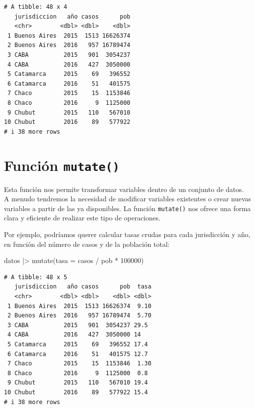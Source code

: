 \documentclass[
  spanish,
  a4paper,
]{scrbook}
\newenvironment{Shaded}{\begin{snugshade}}{\end{snugshade}}
\newcommand{\AttributeTok}[1]{\textcolor[rgb]{0.40,0.45,0.13}{#1}}
\newcommand{\DecValTok}[1]{\textcolor[rgb]{0.68,0.00,0.00}{#1}}
\newcommand{\FunctionTok}[1]{\textcolor[rgb]{0.28,0.35,0.67}{#1}}
\newcommand{\NormalTok}[1]{\textcolor[rgb]{0.00,0.23,0.31}{#1}}
\newcommand{\SpecialCharTok}[1]{\textcolor[rgb]{0.37,0.37,0.37}{#1}}
\begin{document}
\begin{verbatim}
# A tibble: 48 x 4
   jurisdiccion   año casos      pob
   <chr>        <dbl> <dbl>    <dbl>
 1 Buenos Aires  2015  1513 16626374
 2 Buenos Aires  2016   957 16789474
 3 CABA          2015   901  3054237
 4 CABA          2016   427  3050000
 5 Catamarca     2015    69   396552
 6 Catamarca     2016    51   401575
 7 Chaco         2015    15  1153846
 8 Chaco         2016     9  1125000
 9 Chubut        2015   110   567010
10 Chubut        2016    89   577922
# i 38 more rows
\end{verbatim}

\section{\texorpdfstring{Función
\texttt{mutate()}}{Función mutate()}}\label{funciuxf3n-mutate}

Esta función nos permite transformar variables dentro de un conjunto de
datos. A menudo tendremos la necesidad de modificar variables existentes
o crear nuevas variables a partir de las ya disponibles. La función
\texttt{mutate()} nos ofrece una forma clara y eficiente de realizar
este tipo de operaciones.

Por ejemplo, podríamos querer calcular tasas crudas para cada
jurisdicción y año, en función del número de casos y de la población
total:

\begin{Shaded}
\begin{Highlighting}[]
\NormalTok{datos }\SpecialCharTok{|\textgreater{}}
  \FunctionTok{mutate}\NormalTok{(}\AttributeTok{tasa =}\NormalTok{ casos }\SpecialCharTok{/}\NormalTok{ pob }\SpecialCharTok{*} \DecValTok{100000}\NormalTok{)}
\end{Highlighting}
\end{Shaded}

\begin{verbatim}
# A tibble: 48 x 5
   jurisdiccion   año casos      pob  tasa
   <chr>        <dbl> <dbl>    <dbl> <dbl>
 1 Buenos Aires  2015  1513 16626374  9.10
 2 Buenos Aires  2016   957 16789474  5.70
 3 CABA          2015   901  3054237 29.5 
 4 CABA          2016   427  3050000 14   
 5 Catamarca     2015    69   396552 17.4 
 6 Catamarca     2016    51   401575 12.7 
 7 Chaco         2015    15  1153846  1.30
 8 Chaco         2016     9  1125000  0.8 
 9 Chubut        2015   110   567010 19.4 
10 Chubut        2016    89   577922 15.4 
# i 38 more rows
\end{verbatim}
\end{document}

